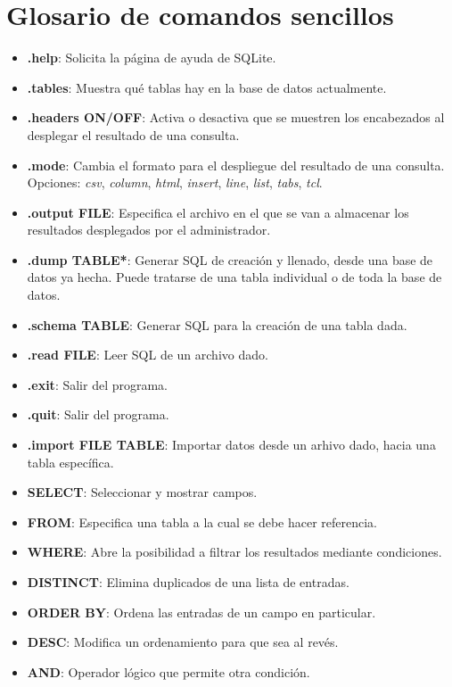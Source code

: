 \documentclass[10pt,letterpaper]{article}
\begin{document}
\section{Glosario de comandos sencillos}
\begin{small}

\begin{itemize}
\item \textbf{.help}: Solicita la p\'agina de ayuda de SQLite.
\item \textbf{.tables}: Muestra qu\'e tablas hay en la base de datos actualmente.
\item \textbf{.headers ON/OFF}: Activa o desactiva que se muestren los encabezados al desplegar el resultado de una consulta.
\item \textbf{.mode}: Cambia el formato para el despliegue del resultado de una consulta. Opciones: \textit{csv}, \textit{column}, \textit{html}, \textit{insert}, \textit{line}, \textit{list}, \textit{tabs}, \textit{tcl}.
\item \textbf{.output FILE}: Especifica el archivo en el que se van a almacenar los resultados desplegados por el administrador.
\item \textbf{.dump TABLE*}: Generar SQL de creaci\'on y llenado, desde una base de datos ya hecha. Puede tratarse de una tabla individual o de toda la base de datos.
\item \textbf{.schema TABLE}: Generar SQL para la creaci\'on de una tabla dada.
\item \textbf{.read FILE}: Leer SQL de un archivo dado.
\item \textbf{.exit}: Salir del programa.
\item \textbf{.quit}: Salir del programa.
\item \textbf{.import FILE TABLE}: Importar datos desde un arhivo dado, hacia una tabla espec\'ifica.
\item \textbf{SELECT}: Seleccionar y mostrar campos.
\item \textbf{FROM}: Especifica una tabla a la cual se debe hacer referencia.
\item \textbf{WHERE}: Abre la posibilidad a filtrar los resultados mediante condiciones.
\item \textbf{DISTINCT}: Elimina duplicados de una lista de entradas.
\item \textbf{ORDER BY}: Ordena las entradas de un campo en particular.
\item \textbf{DESC}: Modifica un ordenamiento para que sea al rev\'es.
\item \textbf{AND}: Operador l\'ogico que permite otra condici\'on.

\end{itemize}
\end{small}
\end{document}
